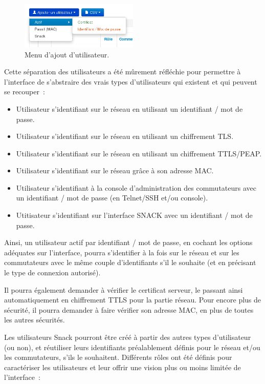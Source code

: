 \begin{figure}[!h]
	\begin{center}
	    \includegraphics[width=0.5\textwidth]{img/menuusers.png}
	\end{center}
	\caption{Menu d'ajout d'utilisateur.}
	\label{menuusers}
\end{figure}

Cette séparation des utilisateurs a été mûrement réfléchie pour permettre à l'interface de s'abstraire des vrais types d'utilisateurs qui existent et qui peuvent se recouper~:

\begin{itemize}
\item Utilisateur s'identifiant sur le réseau en utilisant un identifiant / mot de passe.
\item Utilisateur s'identifiant sur le réseau en utilisant un chiffrement TLS.
\item Utilisateur s'identifiant sur le réseau en utilisant un chiffrement TTLS/PEAP.
\item Utilisateur s'identifiant sur le réseau grâce à son adresse MAC.
\item Utilisateur s'identifiant à la console d'administration des commutateurs avec un identifiant / mot de passe (en Telnet/SSH et/ou console).
\item Utitisateur s'identifiant sur l'interface SNACK avec un identifiant / mot de passe.
\end{itemize}

Ainsi, un utilisateur actif par identifiant / mot de passe, en cochant les options adéquates sur l'interface, pourra s'identifier à la fois sur le réseau et sur les commutateurs avec le même couple d'identifiants s'il le souhaite (et en précisant le type de connexion autorisé).

Il pourra également demander à vérifier le certificat serveur, le passant ainsi automatiquement en chiffrement TTLS pour la partie réseau. Pour encore plus de sécurité, il pourra demander à faire vérifier son adresse MAC, en plus de toutes les autres sécurités.

Les utilisateurs Snack pourront être créé à partir des autres types d'utilisateur (ou non), et réutiliser leurs identifiants préalablement définis pour le réseau et/ou les commutateurs, s'ils le souhaitent. Différents rôles ont été définis pour caractériser les utilisateurs et leur offrir une vision plus ou moins limitée de l'interface~:

